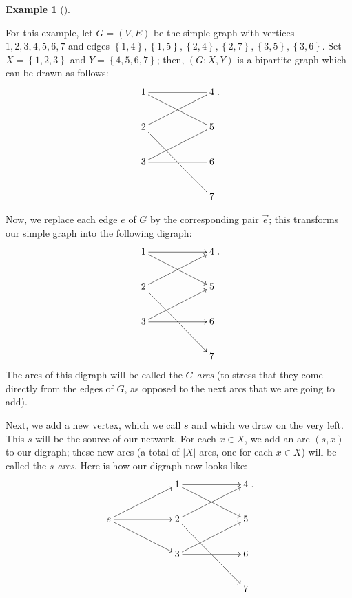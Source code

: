 \documentclass[numbers=enddot,12pt,final,onecolumn,notitlepage]{scrartcl}%
\makeatletter
\theoremstyle{definition}
\newtheorem{exam}[theo]{Example}
\newenvironment{example}[1][]
{\begin{exam}[#1]\begin{leftbar}}
{\end{leftbar}\end{exam}}
\newcommand{\are}{\ar@{-}}
\makeatother
\begin{document}
\begin{example}
For this example, let $G=\left(  V,E\right)  $ be the simple graph with
vertices $1,2,3,4,5,6,7$ and edges $\left\{  1,4\right\}  ,\left\{
1,5\right\}  ,\left\{  2,4\right\}  ,\left\{  2,7\right\}  ,\left\{
3,5\right\}  ,\left\{  3,6\right\}  $. Set $X=\left\{  1,2,3\right\}  $ and
$Y=\left\{  4,5,6,7\right\}  $; then, $\left(  G;X,Y\right)  $ is a bipartite
graph which can be drawn as follows:%
\[%
\xymatrix@C=5pc{
1 \are[r] \are[rd] & 4 \\
2 \are[ru] \are[rdd] & 5 \\
3 \are[ru] \are[r] & 6 \\
& 7
}%
.
\]


Now, we replace each edge $e$ of $G$ by the corresponding pair
$\overrightarrow{e}$; this transforms our simple graph into the following
digraph:%
\[%
\xymatrix@C=5pc{
1 \ar[r] \ar[rd] & 4 \\
2 \ar[ru] \ar[rdd] & 5 \\
3 \ar[ru] \ar[r] & 6 \\
& 7
}%
.
\]
The arcs of this digraph will be called the $G$\textit{-arcs} (to stress that
they come directly from the edges of $G$, as opposed to the next arcs that we
are going to add).

Next, we add a new vertex, which we call $s$ and which we draw on the very
left. This $s$ will be the source of our network. For each $x\in X$, we add an
arc $\left(  s,x\right)  $ to our digraph; these new arcs (a total of
$\left\vert X\right\vert $ arcs, one for each $x\in X$) will be called the
$s$\textit{-arcs}. Here is how our digraph now looks like:%
\[%
\xymatrix@C=5pc{
& 1 \ar[r] \ar[rd] & 4 \\
s \ar[ru] \ar[r] \ar[rd] & 2 \ar[ru] \ar[rdd] & 5 \\
& 3 \ar[ru] \ar[r] & 6 \\
& & 7
}%
.
\]



\end{example}
\end{document}
